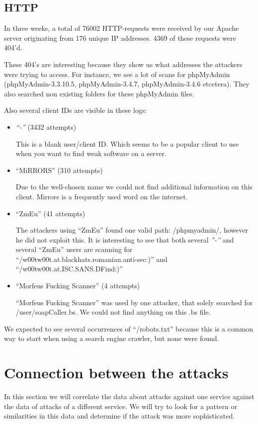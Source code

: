 \documentclass[11pt]{article}
\begin{document}
\subsection{HTTP}
In three weeks, a total of 76002 HTTP-requests were received by our Apache server originating from 176 unique IP addresses. 4369 of these requests were 404'd.

These 404's are interesting because they show us what addresses the attackers were trying to access. For instance, we see a lot of scans for phpMyAdmin (phpMyAdmin-3.3.10.5, phpMyAdmin-3.4.7, phpMyAdmin-3.4.6 etcetera). They also searched non existing folders for these phpMyAdmin files. 

Also several client IDs are visible in these logs: 

\begin{itemize}
\item \emph{``-''} (3432 attempts)

This is a blank user/client ID. Which seems to be a popular client to use when you want to find weak software on a server.

\item ``MiRRORS'' (310 attempts)

Due to the well-chosen name we could not find additional information on this client. Mirrors is a frequently used word on the internet.

\item ``ZmEu'' (41 attempts)

The attackers using ``ZmEu'' found one valid path: /phpmyadmin/, however he did not exploit this. 
It is interesting to see that both several \emph{''-''} and several ``ZmEu'' users are scanning for ``/w00tw00t.at.blackhats.romanian.anti-sec:)'' and ``/w00tw00t.at.ISC.SANS.DFind:)''

\item ``Morfeus Fucking Scanner'' (4 attempts)

``Morfeus Fucking Scanner'' was used by one attacker, that solely searched for /user/soapCaller.bs. We could not find anything on this .bs file.
\end{itemize}

We expected to see several occurrences of ``/robots.txt'' because this is a common way to start when using a search engine crawler, but none were found.


\section{Connection between the attacks}
\label{Connection}
In this section we will correlate the data about attacks against one service against the data of attacks of a different service. We will try to look for a pattern or similarities in this data and determine if the attack was more sophisticated.
\end{document}

